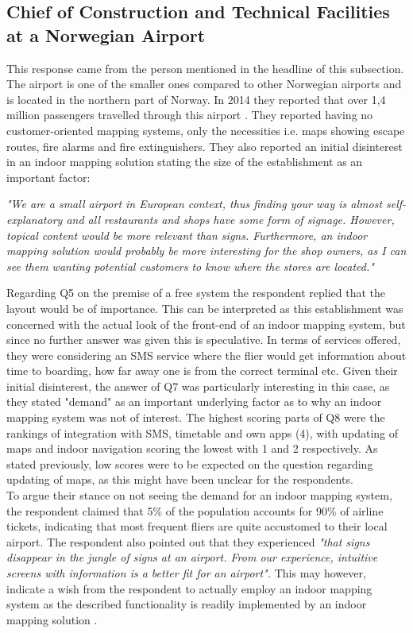 \subsection{Chief of Construction and Technical Facilities at a Norwegian Airport}
This response came from the person mentioned in the headline of this subsection. The airport is one of the smaller ones compared to other Norwegian airports and is located in the northern part of Norway. In 2014 they reported that over 1,4 million passengers travelled through this airport \cite{avinor2014}. They reported having no customer-oriented mapping systems, only the necessities i.e. maps showing escape routes, fire alarms and fire extinguishers. They also reported an initial disinterest in an indoor mapping solution stating the size of the establishment as an important factor:
\begin{displayquote}
\textit{"We are a small airport in European context, thus finding your way is almost self-explanatory and all restaurants and shops have some form of signage. However, topical content would be more relevant than signs. Furthermore, an indoor mapping solution would probably be more interesting for the shop owners, as I can see them wanting potential customers to know where the stores are located."}
\end{displayquote}
Regarding Q5 on the premise of a free system the respondent replied that the layout would be of importance. This can be interpreted as this establishment was concerned with the actual look of the front-end of an indoor mapping system, but since no further answer was given this is speculative. In terms of services offered, they were considering an SMS service where the flier would get information about time to boarding, how far away one is from the correct terminal etc. Given their initial disinterest, the answer of Q7 was particularly interesting in this case, as they stated "demand" as an important underlying factor as to why an indoor mapping system was not of interest. The highest scoring parts of Q8 were the rankings of integration with SMS, timetable and own apps (4), with updating of maps and indoor navigation scoring the lowest with 1 and 2 respectively. As stated previously, low scores were to be expected on the question regarding updating of maps, as this might have been unclear for the respondents. 
\newline
\\
To argue their stance on not seeing the demand for an indoor mapping system, the respondent claimed that 5\% of the population accounts for 90\% of airline tickets, indicating that most frequent fliers are quite accustomed to their local airport. The respondent also pointed out that they experienced \textit{"that signs disappear in the jungle of signs at an airport. From our experience, intuitive screens with information is a better fit for an airport".} This may however, indicate a wish from the respondent to actually employ an indoor mapping system as the described functionality is readily implemented by an indoor mapping solution \cite{mazemap2015}.